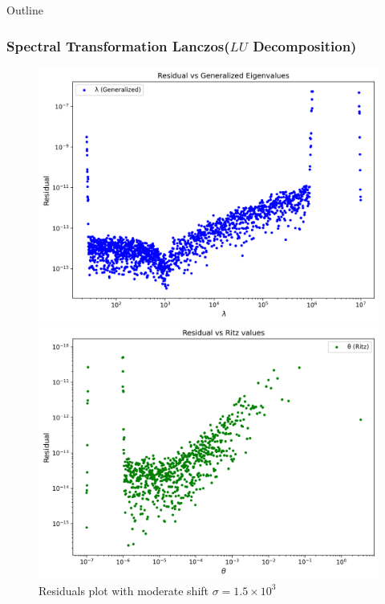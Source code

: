 \documentclass[landscape]{beamer}
\begin{document}
\begin{frame}[allowframebreaks]{Outline}
  \frametitle{Spectral Transformation Lanczos($LU$ Decomposition)}
  
  \begin{figure}
  	\caption{Residuals plot with moderate shift $\sigma=1.5 \times 10^3$}
  	\vspace{1ex}
  	\begin{minipage}{0.45\textwidth} %
  		\centering
  		\includegraphics[scale=.25]{./Plots/LU/residual_lu_gs.png}
  		\subcaption{}
  	\end{minipage}%
  	\hfill
  	\begin{minipage}{0.45\textwidth}
  		\centering
  		\includegraphics[scale=.25]{./Plots/LU/residual_lu_rs.png}
  		\subcaption{}
  	\end{minipage}
  	

\end{figure}
\end{frame}
\end{document}
